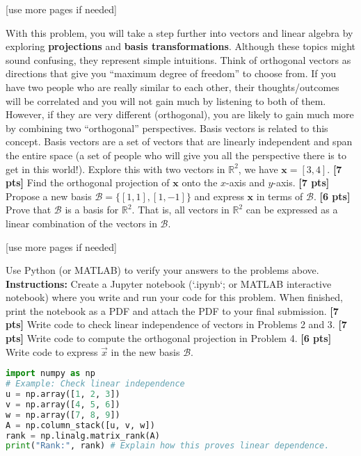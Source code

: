 \documentclass{ee102_pset}
\begin{document}
\vspace*{\fill}
\begin{center}
[use more pages if needed]
\end{center}




 With this problem, you will take a step further into vectors and linear algebra by exploring \textbf{projections} and \textbf{basis transformations}. Although these topics might sound confusing, they represent simple intuitions. Think of orthogonal vectors as directions that give you ``maximum degree of freedom'' to choose from. If you have two people who are really similar to each other, their thoughts/outcomes will be correlated and you will not gain much by listening to both of them. However, if they are very different (orthogonal), you are likely to gain much more by combining two ``orthogonal'' perspectives. Basis vectors is related to this concept. Basis vectors are a set of vectors that are linearly independent and span the entire space (a set of people who will give you all the perspective there is to get in this world!). Explore this with two vectors in $\mathbb{R}^2$, we have $\textbf{x} = [3, 4]$.
\problempart \textbf{[7 pts]} Find the orthogonal projection of $\textbf{x}$ onto the $x$-axis and $y$-axis.
\problempart \textbf{[7 pts]} Propose a new basis $\mathcal{B} = \{[1, 1], [1, -1]\}$ and express $\textbf{x}$ in terms of $\mathcal{B}$.
\problempart \textbf{[6 pts]} Prove that $\mathcal{B}$ is a basis for $\mathbb{R}^2$. That is, all vectors in $\mathbb{R}^2$ can be expressed as a linear combination of the vectors in $\mathcal{B}$.

\vspace*{\fill}
\begin{center}
[use more pages if needed]
\end{center}



Use Python (or MATLAB) to verify your answers to the problems above.
\\ \textbf{Instructions:} Create a Jupyter notebook (`.ipynb`; or MATLAB interactive notebook) where you write and run your code for this problem. When finished, print the notebook as a PDF and attach the PDF to your final submission.
\problempart \textbf{[7 pts]} Write code to check linear independence of vectors in Problems 2 and 3.
\problempart \textbf{[7 pts]} Write code to compute the orthogonal projection in Problem 4.
\problempart \textbf{[6 pts]} Write code to express $\vec{x}$ in the new basis $\mathcal{B}$.

\begin{lstlisting}[language=Python, caption=Starter code for Problem 5]
import numpy as np
# Example: Check linear independence
u = np.array([1, 2, 3])
v = np.array([4, 5, 6])
w = np.array([7, 8, 9])
A = np.column_stack([u, v, w])
rank = np.linalg.matrix_rank(A)
print("Rank:", rank) # Explain how this proves linear dependence.
\end{lstlisting}
\end{document}
